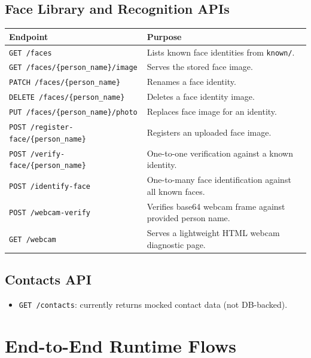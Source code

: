 \documentclass[12pt,a4paper]{article}
\begin{document}
\subsection{Face Library and Recognition APIs}
\begin{longtable}{p{} p{}}
\toprule
\textbf{Endpoint} & \textbf{Purpose} \\
\midrule
\endhead
\texttt{GET /faces} & Lists known face identities from \texttt{known/}. \\
\texttt{GET /faces/\{person\_name\}/image} & Serves the stored face image. \\
\texttt{PATCH /faces/\{person\_name\}} & Renames a face identity. \\
\texttt{DELETE /faces/\{person\_name\}} & Deletes a face identity image. \\
\texttt{PUT /faces/\{person\_name\}/photo} & Replaces face image for an identity. \\
\texttt{POST /register-face/\{person\_name\}} & Registers an uploaded face image. \\
\texttt{POST /verify-face/\{person\_name\}} & One-to-one verification against a known identity. \\
\texttt{POST /identify-face} & One-to-many face identification against all known faces. \\
\texttt{POST /webcam-verify} & Verifies base64 webcam frame against provided person name. \\
\texttt{GET /webcam} & Serves a lightweight HTML webcam diagnostic page. \\
\bottomrule
\end{longtable}

\subsection{Contacts API}
\begin{itemize}
  \item \texttt{GET /contacts}: currently returns mocked contact data (not DB-backed).
\end{itemize}

\section{End-to-End Runtime Flows}
\end{document}
